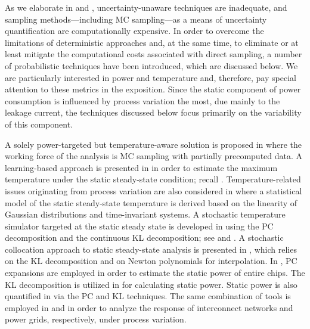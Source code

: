As we elaborate in  and , uncertainty-unaware
techniques are inadequate, and sampling methods---including \ac{MC}
sampling---as a means of uncertainty quantification are computationally
expensive. In order to overcome the limitations of deterministic approaches and,
at the same time, to eliminate or at least mitigate the computational costs
associated with direct sampling, a number of probabilistic techniques have been
introduced, which are discussed below. We are particularly interested in power
and temperature and, therefore, pay special attention to these metrics in the
exposition. Since the static component of power consumption is influenced by
process variation the most, due mainly to the leakage current, the techniques
discussed below focus primarily on the variability of this component.

A solely power-targeted but temperature-aware solution is proposed in
\cite{chandra2010} where the working force of the analysis is \ac{MC} sampling
with partially precomputed data. A learning-based approach is presented in
\cite{juan2011} in order to estimate the maximum temperature under the static
steady-state condition; recall .
Temperature-related issues originating from process variation are also
considered in \cite{juan2012} where a statistical model of the static
steady-state temperature is derived based on the linearity of Gaussian
distributions and time-invariant systems. A stochastic temperature simulator
targeted at the static steady state is developed in \cite{huang2009a} using the
\ac{PC} decomposition and the continuous \ac{KL} decomposition; see
 and . A stochastic
collocation \cite{maitre2010, xiu2010} approach to static steady-state analysis
is presented in \cite{lee2013}, which relies on the \ac{KL} decomposition and on
Newton polynomials for interpolation. In \cite{shen2009}, \ac{PC} expansions are
employed in order to estimate the static power of entire chips. The \ac{KL}
decomposition is utilized in \cite{bhardwaj2006} for calculating static power.
Static power is also quantified in \cite{bhardwaj2008} via the \ac{PC} and
\ac{KL} techniques. The same combination of tools is employed in
\cite{vrudhula2006} and \cite{ghanta2006} in order to analyze the response of
interconnect networks and power grids, respectively, under process variation.

